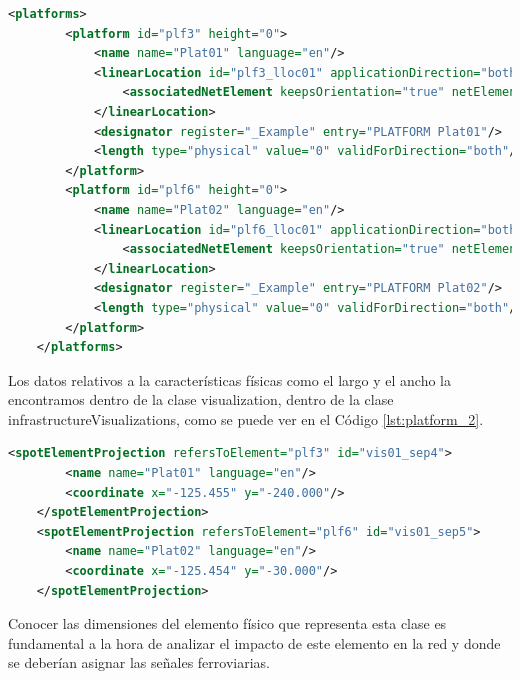     \begin{lstlisting}[language = XML, caption = Clase Platform , label = {lst:platform_1}]
    <platforms>
        <platform id="plf3" height="0">
            <name name="Plat01" language="en"/>
            <linearLocation id="plf3_lloc01" applicationDirection="both">
                <associatedNetElement keepsOrientation="true" netElementRef="ne1"/>
            </linearLocation>
            <designator register="_Example" entry="PLATFORM Plat01"/>
            <length type="physical" value="0" validForDirection="both"/>
        </platform>
        <platform id="plf6" height="0">
            <name name="Plat02" language="en"/>
            <linearLocation id="plf6_lloc01" applicationDirection="both">
                <associatedNetElement keepsOrientation="true" netElementRef="ne3"/>
            </linearLocation>
            <designator register="_Example" entry="PLATFORM Plat02"/>
            <length type="physical" value="0" validForDirection="both"/>
        </platform>
    </platforms>
    \end{lstlisting}

    Los datos relativos a la características físicas como el largo y el ancho la encontramos dentro de la clase visualization, dentro de la clase infrastructureVisualizations, como se puede ver en el Código \ref{lst:platform_2}.

    \begin{lstlisting}[language = XML, caption = Clase visualization , label = {lst:platform_2}]
    <spotElementProjection refersToElement="plf3" id="vis01_sep4">
        <name name="Plat01" language="en"/>
        <coordinate x="-125.455" y="-240.000"/>
    </spotElementProjection>
    <spotElementProjection refersToElement="plf6" id="vis01_sep5">
        <name name="Plat02" language="en"/>
        <coordinate x="-125.454" y="-30.000"/>
    </spotElementProjection>
    \end{lstlisting}

    Conocer las dimensiones del elemento físico que representa esta clase es fundamental a la hora de analizar el impacto de este elemento en la red y donde se deberían asignar las señales ferroviarias.